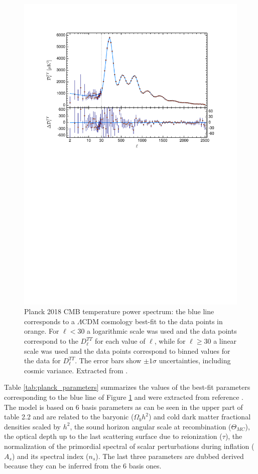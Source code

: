 \documentclass[openany,a4paper,12pt,oneside]{book}
\begin{document}
\begin{spacing}{1.5}
\begin{figure}[!htb]
    \centering
    \includegraphics[width=.9\linewidth]{Imagens/planck_spectrum.pdf}
    \caption{Planck 2018 CMB temperature power spectrum: the blue line corresponds to a $\Lambda$CDM cosmology best-fit to the data points in orange. For $\ell<30$ a logarithmic scale was used and the data points correspond to the $D_\ell^{TT}$ for each value of $\ell$, while for $\ell\ge 30$ a linear scale was used and the data points correspond to binned values for the data for $D_{\ell}^{TT}$. The error bars show $\pm 1\sigma$ uncertainties, including cosmic variance. Extracted from \cite{Planck_results}.}
    \label{fig:Planck_spectrum}
\end{figure} 

Table \ref{tab:planck_parameters} summarizes the values of the best-fit parameters corresponding to the blue line of Figure \ref{fig:Planck_spectrum} and were extracted from reference \cite{Planck_results}. The model is based on 6 basis parameters as can be seen in the upper part of table 2.2 and are related to the baryonic ($\Omega_b h^2$) and cold dark matter fractional densities scaled by $h^2$, the sound horizon angular scale at recombination ($\Theta_{MC}$), the optical depth up to the last scattering surface  due to reionization ($\tau$), the normalization of the primordial spectral of scalar perturbations during inflation ($A_s$) and its spectral index ($n_s$). The last three parameters are dubbed derived because they can be inferred from the 6 basis ones.


\end{spacing}
\end{document}
